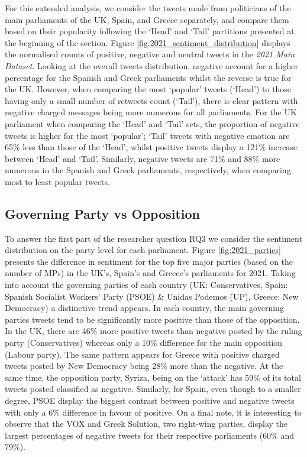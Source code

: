 For this extended analysis, we consider the tweets made from politicians of the main parliaments of the UK, Spain, and Greece separately, and compare them based on their popularity following the `Head' and `Tail' partitions presented at the beginning of the section. Figure \ref{fig:2021_sentiment_distribution} displays the normalised counts of positive, negative and neutral tweets in the \textit{2021 Main Dataset}. 
Looking at the overall tweets distribution, negative account for a higher percentage for the Spanish and Greek parliaments whilst the reverse is true for the UK. However, when comparing the most `popular' tweets (`Head') to those having only a small number of retweets count (`Tail'), there is clear pattern with negative charged messages being more numerous for all parliaments.
For the UK parliament when comparing the `Head' and `Tail' sets, the proportion of negative tweets is higher for the most `popular'; `Tail' tweets with negative emotion are 65\% less than those of the `Head', whilst positive tweets display a 121\% increase between `Head' and `Tail'. Similarly, negative tweets are 71\% and 88\% more numerous in the Spanish and Greek parliaments, respectively, when comparing most to least popular tweets.


\subsection{Governing Party vs Opposition}
\label{sec:opposition}

To answer the first part of the researcher question RQ3 we consider the sentiment distribution on the party level for each parliament. Figure \ref{fig:2021_parties} presents the difference in sentiment for the top five major parties (based on the number of \acp{MP}) in the UK's, Spain's and Greece's parliaments for 2021. Taking into account the governing parties of each country (UK: Conservatives, Spain: Spanish Socialist Workers' Party (PSOE) \& Unidas Podemos (UP), Greece: New Democracy) a distinctive trend appears. In each country, the main governing parties tweets tend to be significantly more positive than those of the opposition. In the UK, there are 46\% more positive tweets than negative posted by the ruling party (Conservatives) whereas only a 10\% difference for the main opposition (Labour party). The same pattern appears for Greece with positive charged tweets posted by New Democracy being 28\% more than the negative. At the same time, the opposition party, Syriza, being on the `attack' has 59\% of its total tweets posted classified as negative. Similarly, for Spain, even though to a smaller degree, PSOE display the biggest contrast between positive and negative tweets with only a 6\% difference in favour of positive. 
On a final note, it is interesting to observe that the VOX and Greek Solution, two right-wing parties, display the largest percentages of negative tweets for their respective parliaments (60\% and 79\%).






